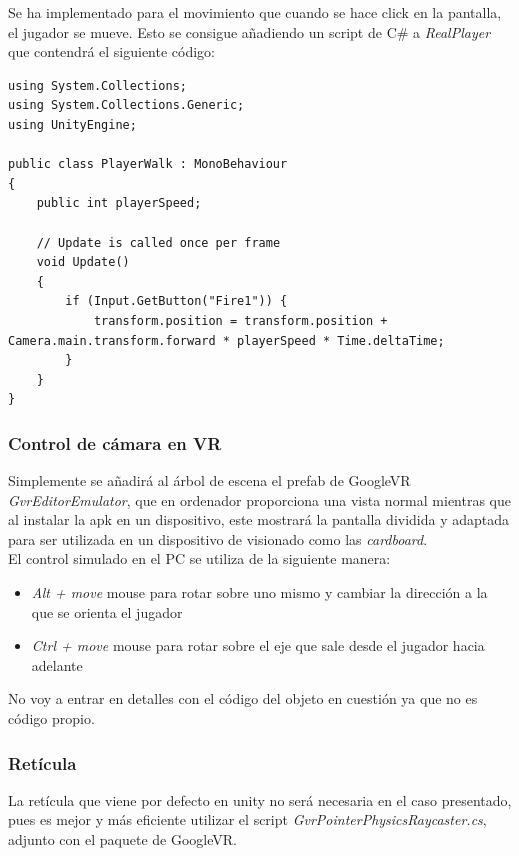 \quad Se ha implementado para el movimiento que cuando se hace click en la pantalla, el jugador se mueve. Esto se consigue añadiendo un script de C\# a \textit{RealPlayer} que contendrá el siguiente código:

\lstset{language=[sharp]C, breaklines=true, basicstyle=\footnotesize}
\begin{lstlisting}[frame=single, caption={PlayerWalk.cs}]
using System.Collections;
using System.Collections.Generic;
using UnityEngine;

public class PlayerWalk : MonoBehaviour
{
    public int playerSpeed;

    // Update is called once per frame
    void Update()
    {
        if (Input.GetButton("Fire1")) {
            transform.position = transform.position + Camera.main.transform.forward * playerSpeed * Time.deltaTime;
        }
    }
}

\end{lstlisting}

\subsubsection{Control de cámara en VR}

\quad Simplemente se añadirá al árbol de escena el prefab de GoogleVR \textit{GvrEditorEmulator}, que en ordenador proporciona una vista normal mientras que al instalar la apk en un dispositivo, este mostrará la pantalla dividida y adaptada para ser utilizada en un dispositivo de visionado como las \textit{cardboard}.\\

\quad El control simulado en el PC se utiliza de la siguiente manera:
\begin{itemize}
	\item \textit{Alt + move} mouse para rotar sobre uno mismo y cambiar la dirección a la que se orienta el jugador
	\item \textit{Ctrl + move} mouse para rotar sobre el eje que sale desde el jugador hacia adelante
\end{itemize}

\quad No voy a entrar en detalles con el código del objeto en cuestión ya que no es código propio.\\

\subsubsection{Retícula}

\quad La retícula que viene por defecto en unity no será necesaria en el caso presentado, pues es mejor y más eficiente utilizar el script \textit{GvrPointerPhysicsRaycaster.cs}, adjunto con el paquete de GoogleVR.\\

